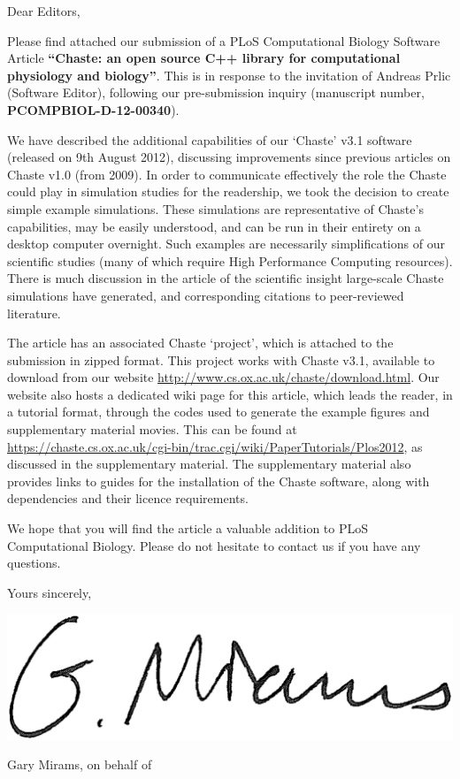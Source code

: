 \documentclass{oxcsletter}
\begin{document}
\begin{letter}{}

\subject{Re. Submission of Software Article to PLoS Computational Biology}  

\opening{Dear Editors,}

Please find attached our submission of a PLoS Computational Biology Software Article {\bf ``Chaste: an open source C++ library for computational physiology and biology''}.
This is in response to the invitation of Andreas Prlic (Software Editor), 
following our pre-submission inquiry (manuscript number, \textbf{PCOMPBIOL-D-12-00340}).

We have described the additional capabilities of our `Chaste' v3.1 software (released on 9th August 2012), discussing improvements since previous articles on Chaste v1.0 (from 2009).
In order to communicate effectively the role the Chaste could play in simulation studies for the readership, we took the decision to create simple example simulations. 
These simulations are representative of Chaste's capabilities, may be easily understood, and can be run in their entirety on a desktop computer overnight.
Such examples are necessarily simplifications of our scientific studies (many of which require High Performance Computing resources).
There is much discussion in the article of the scientific insight large-scale Chaste simulations have generated, and corresponding citations to peer-reviewed literature.

The article has an associated Chaste `project', which is attached to the submission in zipped format. 
This project works with Chaste v3.1, available to download from our website \url{http://www.cs.ox.ac.uk/chaste/download.html}. 
Our website also hosts a dedicated wiki page for this article, which leads the reader, in a tutorial format, through the codes used to generate the example figures and supplementary material movies. 
This can be found at \url{https://chaste.cs.ox.ac.uk/cgi-bin/trac.cgi/wiki/PaperTutorials/Plos2012}, as discussed in the supplementary material. 
The supplementary material also provides links to guides for the installation of the Chaste software, along with dependencies and their licence requirements.

We hope that you will find the article a valuable addition to PLoS Computational Biology. 
Please do not hesitate to contact us if you have any questions.

Yours sincerely,

\includegraphics[width=0.2\linewidth]{signature}
\closing{Gary Mirams, on behalf of }

\end{letter}
\end{document}
